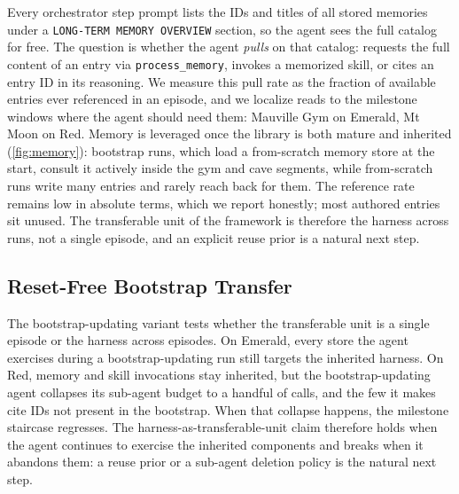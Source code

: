 \documentclass[11pt]{article}
\begin{document}
Every orchestrator step prompt lists the IDs and titles of all stored memories under a \texttt{LONG-TERM MEMORY OVERVIEW} section, so the agent sees the full catalog for free. The question is whether the agent \emph{pulls} on that catalog: requests the full content of an entry via \texttt{process\_memory}, invokes a memorized skill, or cites an entry ID in its reasoning. We measure this pull rate as the fraction of available entries ever referenced in an episode, and we localize reads to the milestone windows where the agent should need them: Mauville Gym on Emerald, Mt Moon on Red. Memory is leveraged once the library is both mature and inherited (\cref{fig:memory}): bootstrap runs, which load a from-scratch memory store at the start, consult it actively inside the gym and cave segments, while from-scratch runs write many entries and rarely reach back for them. The reference rate remains low in absolute terms, which we report honestly; most authored entries sit unused. The transferable unit of the framework is therefore the harness across runs, not a single episode, and an explicit reuse prior is a natural next step.

\subsection{Reset-Free Bootstrap Transfer}\label{app:bootstrap}

The bootstrap-updating variant tests whether the transferable unit is a single episode or the harness across episodes. On Emerald, every store the agent exercises during a bootstrap-updating run still targets the inherited harness. On Red, memory and skill invocations stay inherited, but the bootstrap-updating agent collapses its sub-agent budget to a handful of calls, and the few it makes cite IDs not present in the bootstrap. When that collapse happens, the milestone staircase regresses. The harness-as-transferable-unit claim therefore holds when the agent continues to exercise the inherited components and breaks when it abandons them: a reuse prior or a sub-agent deletion policy is the natural next step.
\end{document}
